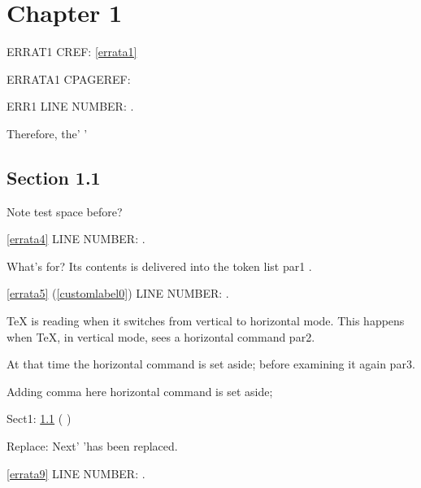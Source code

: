\documentclass[a4paper,12pt]{report}
\makeatletter
\newcommand{\getCurrentSectionNumber}{%
  \ifnum\c@section=0 %
  \thechapter
  \else
  \ifnum\c@subsection=0 %
  \thesection
  \else
  \ifnum\c@subsubsection=0 %
  \thesubsection
  \else
  \thesubsubsection
  \fi
  \fi
  \fi
}
\makeatother
\begin{document}

\chapter{Chapter 1}\label{chap-one}

\immediate{}%





ERRAT1 CREF: \cref{errata1}

ERRATA1 CPAGEREF: 

ERR1 LINE NUMBER: .


Therefore, the'
'

\section{Section 1.1}\label{sect-one}

Note test  space before?


\cref{errata4} LINE NUMBER: .

What's for? Its contents is delivered into the token list par1 .

\cref{errata5} (\cref{customlabel0}) LINE NUMBER: .

TeX is reading when it switches from vertical to horizontal mode.  This happens when TeX, in vertical mode, sees a horizontal command par2.

At that time the horizontal command is set aside;  before examining it again par3.



Adding comma here\erratumAdd{,} horizontal command is set aside;

Sect1: \cref{sect-one}  (\getCurrentSectionNumber)

Replace: Next'  'has been replaced.

\cref{errata9} LINE NUMBER: .
\end{document}
